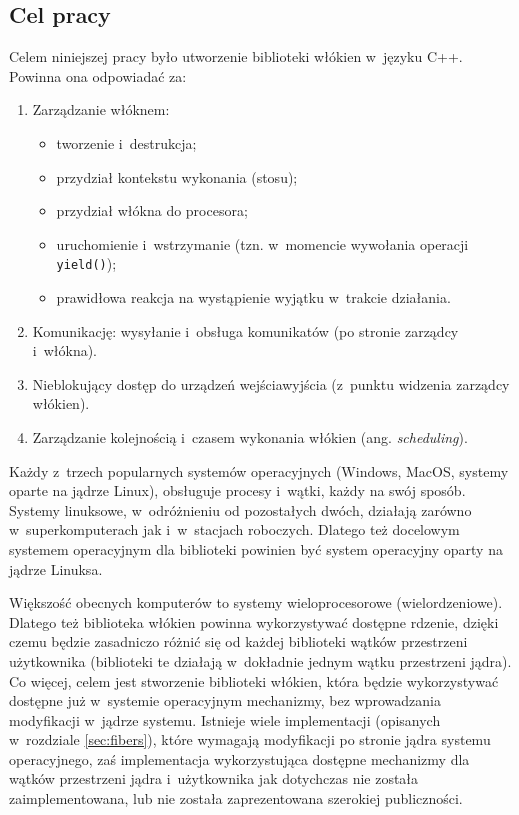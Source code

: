 \documentclass[12pt]{mwart}
\newcommand{\code}{\texttt}
\newcommand{\procbr}{()}
\newcommand{\function}[1]{\code{#1\procbr}}
\begin{document}
\subsection{Cel pracy}
\label{sec:target}
\indent
  Celem niniejszej pracy było utworzenie biblioteki włókien w~języku C++.
	Powinna ona odpowiadać za:
	\begin{enumerate}
		\item Zarządzanie włóknem:
		\begin{itemize}
			\item tworzenie i~destrukcja;
			\item przydział kontekstu wykonania (stosu);
			\item przydział włókna do procesora;
			\item uruchomienie i~wstrzymanie (tzn. w~momencie wywołania operacji \function{yield});
			\item prawidłowa reakcja na wystąpienie wyjątku w~trakcie działania.
		\end{itemize}
		\item Komunikację: wysyłanie i~obsługa komunikatów (po stronie zarządcy i~włókna).
		\item Nieblokujący dostęp do  urządzeń wejścia\dywiz wyjścia (z~punktu widzenia zarządcy włókien).
    \item Zarządzanie kolejnością i~czasem wykonania włókien (ang. \emph{scheduling}). \label{enm:timesch}
	\end{enumerate}
\par
\indent
  Każdy z~trzech popularnych systemów operacyjnych (Windows, MacOS, systemy oparte na jądrze Linux), obsługuje procesy i~wątki, każdy na swój sposób. Systemy linuksowe,
  w~odróżnieniu od pozostałych dwóch, działają zarówno w~superkomputerach jak i~w~stacjach roboczych. Dlatego też docelowym systemem operacyjnym dla biblioteki
  powinien być system operacyjny oparty na jądrze Linuksa.
\par
\indent
  Większość obecnych komputerów to systemy wieloprocesorowe (wielordzeniowe). Dlatego też biblioteka włókien powinna wykorzystywać dostępne rdzenie, dzięki czemu będzie
  zasadniczo różnić się od każdej biblioteki wątków przestrzeni użytkownika (biblioteki te działają w~dokładnie jednym wątku przestrzeni jądra).
  Co więcej, celem jest stworzenie biblioteki włókien, która będzie wykorzystywać dostępne już w~systemie operacyjnym mechanizmy, bez wprowadzania modyfikacji w~jądrze
  systemu. Istnieje wiele implementacji (opisanych w~rozdziale \ref{sec:fibers}), które wymagają modyfikacji po stronie jądra systemu operacyjnego, zaś implementacja
  wykorzystująca dostępne mechanizmy dla wątków przestrzeni jądra i~użytkownika jak dotychczas nie została zaimplementowana, lub nie została zaprezentowana szerokiej publiczności.
\par
%
\end{document}

